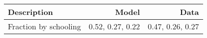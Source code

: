 \begin{tabular}{lrr}
\hline
Description & Model  & Data  \\
\hline
Fraction by schooling & 0.52, 0.27, 0.22  & 0.47, 0.26, 0.27  \\
\hline
\end{tabular}%
